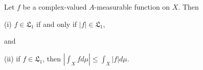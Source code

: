 Let $f$ be a complex-valued $A$-measurable function on $X$. Then

(i) $f \in \mathfrak{L}_1$ if and only if $|f| \in \mathfrak{L}_1$,

and

(ii) if $f \in \mathfrak{L}_1$, then $\left| \int_X f d\mu \right| \leq \int_X |f| d\mu$.